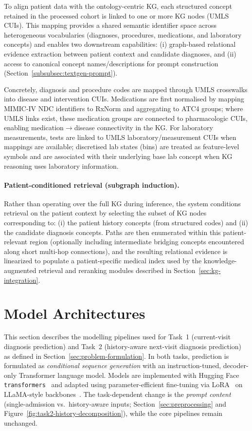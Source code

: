 To align patient data with the ontology-centric KG, each structured concept retained in the processed cohort is linked to one or more KG nodes (UMLS CUIs). This mapping provides a shared semantic identifier space across heterogeneous vocabularies (diagnoses, procedures, medications, and laboratory concepts) and enables two downstream capabilities: (i) graph-based relational evidence extraction between patient context and candidate diagnoses, and (ii) access to canonical concept names/descriptions for prompt construction (Section~\ref{subsubsec:textgen-prompt}).

Concretely, diagnosis and procedure codes are mapped through UMLS crosswalks into disease and intervention CUIs. Medications are first normalised by mapping MIMIC-IV NDC identifiers to RxNorm and aggregating to ATC4 groups; where UMLS links exist, these medication groups are connected to pharmacologic CUIs, enabling medication$\rightarrow$disease connectivity in the KG. For laboratory measurements, tests are linked to UMLS laboratory/measurement CUIs when mappings are available; discretised lab states (bins) are treated as feature-level symbols and are associated with their underlying base lab concept when KG reasoning uses laboratory information.

\paragraph{Patient-conditioned retrieval (subgraph induction).}
Rather than operating over the full KG during inference, the system conditions retrieval on the patient context by selecting the subset of KG nodes corresponding to: (i) the patient history concepts (from structured codes) and (ii) the candidate diagnosis concepts. Paths are then enumerated within this patient-relevant region (optionally including intermediate bridging concepts encountered along short multi-hop connections), and the resulting relational evidence is linearized to populate a patient-specific medical index used by the knowledge-augmented retrieval and reranking modules described in Section~\ref{sec:kg-integration}.
\section{Model Architectures}
\label{sec:model-architectures}

This section describes the modelling pipelines used for Task~1 (current-visit diagnosis prediction) and Task~2 (history-aware next-visit diagnosis prediction) as defined in Section~\ref{sec:problem-formulation}. In both tasks, prediction is formulated as \emph{conditional sequence generation} with an instruction-tuned, decoder-only Transformer language model. Models are implemented with Hugging Face \texttt{transformers}~\cite{wolf2020transformers} and adapted using parameter-efficient fine-tuning via LoRA~\cite{hu2021lora} on LLaMA-style backbones~\cite{touvron2023llama}. The task-dependent change is the \emph{prompt content} (single-admission vs.\ history-aware inputs; Section~\ref{sec:preprocessing} and Figure~\ref{fig:task2-history-decomposition}), while the core pipelines remain unchanged.

